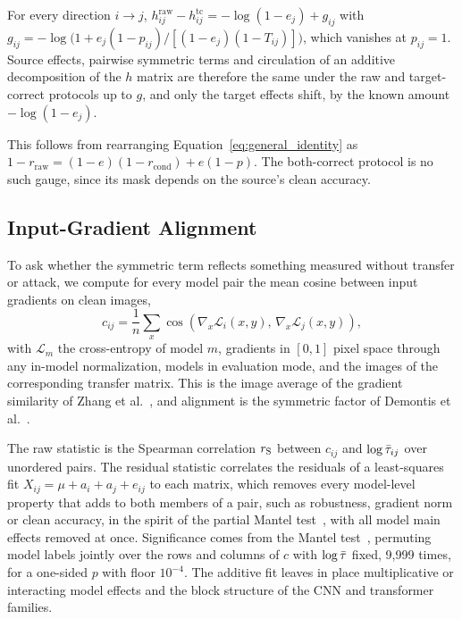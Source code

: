 \begin{proposition}
\label{prop:hscale}
For every direction $i \to j$, $h^{\mathrm{raw}}_{ij} - h^{\mathrm{tc}}_{ij} = -\log(1 - e_j) + g_{ij}$ with $g_{ij} = -\log\bigl(1 + e_j(1-p_{ij})/[(1-e_j)(1-T_{ij})]\bigr)$, which vanishes at $p_{ij} = 1$. Source effects, pairwise symmetric terms and circulation of an additive decomposition of the $h$ matrix are therefore the same under the raw and target-correct protocols up to $g$, and only the target effects shift, by the known amount $-\log(1-e_j)$.
\end{proposition}

This follows from rearranging Equation~\eqref{eq:general_identity} as $1 - r_{\text{raw}} = (1-e)(1-r_{\text{cond}}) + e(1-p)$. The both-correct protocol is no such gauge, since its mask depends on the source's clean accuracy.

\subsection{Input-Gradient Alignment}
\label{subsec:gradcos_def}

To ask whether the symmetric term reflects something measured without transfer or attack, we compute for every model pair the mean cosine between input gradients on clean images,
\begin{equation}
c_{ij} = \frac{1}{n}\sum_{x} \cos\left(\nabla_x \mathcal{L}_i(x,y),\, \nabla_x \mathcal{L}_j(x,y)\right),
\label{eq:cij}
\end{equation}
with $\mathcal{L}_m$ the cross-entropy of model $m$, gradients in $[0,1]$ pixel space through any in-model normalization, models in evaluation mode, and the images of the corresponding transfer matrix. This is the image average of the gradient similarity of Zhang et al.~\cite{zhang2024why}, and alignment is the symmetric factor of Demontis et al.~\cite{demontis2019adversarial}.

The raw statistic is the Spearman correlation $r_{\mathrm{S}}$ between $c_{ij}$ and $\log\bar{\tau}_{ij}$ over unordered pairs. The residual statistic correlates the residuals of a least-squares fit $X_{ij} = \mu + a_i + a_j + e_{ij}$ to each matrix, which removes every model-level property that adds to both members of a pair, such as robustness, gradient norm or clean accuracy, in the spirit of the partial Mantel test~\cite{smouse1986multiple}, with all model main effects removed at once. Significance comes from the Mantel test~\cite{mantel1967detection}, permuting model labels jointly over the rows and columns of $c$ with $\log\bar{\tau}$ fixed, 9{,}999 times, for a one-sided $p$ with floor $10^{-4}$. The additive fit leaves in place multiplicative or interacting model effects and the block structure of the CNN and transformer families.

